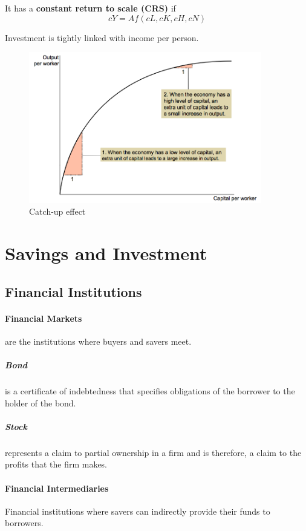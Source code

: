 \documentclass[a4paper,titlepage] {scrartcl}
\begin{document}
It has a \textbf{constant return to scale (CRS)} if 
\begin{equation}
	cY = Af(cL,cK,cH,cN)
\end{equation}

Investment is tightly linked with income per person.

\begin{figure}[htbp]
	\centering
		\includegraphics[height=2.6in]{images/catchup.png}
	\caption{Catch-up effect}
	\label{fig:images_catchup}
\end{figure}


\section{Savings and Investment}
\subsection{Financial Institutions} %
\label{sub:financial_institutions}
\paragraph{Financial Markets} %
\label{par:financial_markets}
are the institutions where buyers and savers meet.
\subparagraph{Bond} %
\label{subp:bond}
is a certificate of indebtedness that specifies obligations of the 
borrower to the holder of the bond.

\subparagraph{Stock} %
\label{subp:stock}
represents a claim to partial ownership in a firm and is therefore, 
a claim to the profits that the firm makes. 


\paragraph{Financial Intermediaries} %
\label{par:financial_intermediaries}
Financial institutions where savers can indirectly provide their funds to borrowers.
\end{document}
